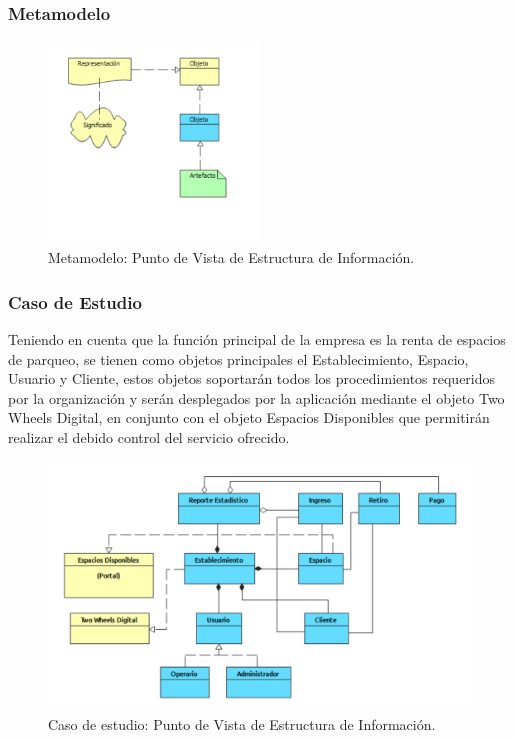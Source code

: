\subsubsection{Metamodelo}
\begin{figure}[H]
	\centering
	\includegraphics[width=0.5\textwidth]{imagenes/Metamodelos/Tecnologia/meta_estructura_informacion.PDF}
	\caption{Metamodelo: Punto de Vista de Estructura de Información.}
	\label{fig:gap_analysis}
\end{figure}

\subsubsection{Caso de Estudio}
Teniendo en cuenta que la función principal de la empresa es la renta de espacios de parqueo, se tienen como objetos principales el Establecimiento, Espacio, Usuario y Cliente, estos objetos soportarán todos los procedimientos requeridos por la organización y serán desplegados por la aplicación mediante el objeto Two Wheels Digital, en conjunto con el objeto Espacios Disponibles que permitirán realizar el debido control del servicio ofrecido.

\begin{figure}[H]
	\centering
	\includegraphics[width=1.0\textwidth]{imagenes/Caso_Estudio/Tecnologia/estructura_informacion.PDF}
	\caption{Caso de estudio: Punto de Vista de Estructura de Información.}
	\label{fig:gap_analysis}
\end{figure}


